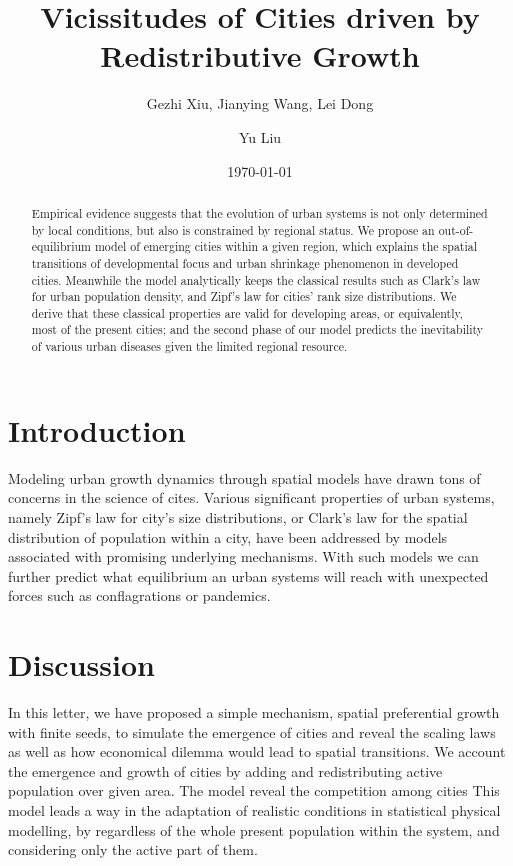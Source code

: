 \documentclass[reprint,unsortedaddress,amsmath,amssymb,aps,prl,showkeys]{revtex4-2}
\begin{document}
\title{Vicissitudes of Cities driven by Redistributive Growth}
\author{Gezhi Xiu, Jianying Wang, Lei Dong}
\author{Yu Liu}
\date{\today}

\begin{abstract}
    Empirical evidence suggests that the evolution of urban systems is not only determined by local conditions, but also is constrained by regional status. We propose an out-of-equilibrium model of emerging cities within a given region, which explains the spatial transitions of developmental focus and urban shrinkage phenomenon in developed cities. Meanwhile the model analytically keeps the classical results such as Clark's law for urban population density, and Zipf's law for cities' rank size distributions. We derive that these classical properties are valid for developing areas, or equivalently, most of the present cities; and the second phase of our model predicts the inevitability of various urban diseases given the limited regional resource. 
\end{abstract}
\maketitle
\section{Introduction}

Modeling urban growth dynamics through spatial models have drawn tons of concerns in the science of cites. Various significant properties of urban systems, namely Zipf's law for city's size distributions, or Clark's law for the spatial distribution of population within a city, have been addressed by models associated with promising underlying mechanisms. With such models we can further predict what equilibrium an urban systems will reach with unexpected forces such as conflagrations or pandemics. 


\section{Discussion}


In this letter, we have proposed a simple mechanism, spatial preferential growth with finite seeds, to simulate the emergence of cities and reveal the scaling laws as well as how economical dilemma would lead to spatial transitions. We account the emergence and growth of cities by adding and redistributing active population over given area. The model reveal the competition among cities
This model leads a way in the adaptation of realistic conditions in statistical physical modelling, by regardless of the whole present population within the system, and considering only the active part of them. 
\end{document}
